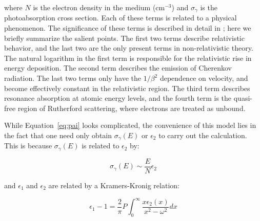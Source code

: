 where $N$ is the electron density in the medium (cm$^{-3}$) and $\sigma_{\gamma}$ is the photoabsorption cross section. Each of these terms is related to a physical phenomenon. The significance of these terms is described in detail in \cite{AllisonCobb:1980}; here we briefly summarize the salient points. The first two terms describe relativistic behavior, and the last two are the only present terms in non-relativistic theory. The natural logarithm in the first term is responsible for the relativistic rise in energy deposition. The second term describes the emission of Cherenkov radiation. The last two terms only have the $1/\beta^{2}$ dependence on velocity, and become effectively constant in the relativistic region. The third term describes resonance absorption at atomic energy levels, and the fourth term is the quasi-free region of Rutherford scattering, where electrons are treated as unbound.


While Equation~\ref{eq:pai} looks complicated, the convenience of this model lies in the fact that one need only obtain $\sigma_{\gamma}(E)$ or $\epsilon_{2}$ to carry out the calculation. This is because $\sigma_{\gamma}(E)$ is related to $\epsilon_{2}$ by:

\begin{equation}
\label{eq:sigma_gamma}
\sigma_{\gamma}(E) \sim \frac{E}{N} \epsilon_{2}
\end{equation}

and $\epsilon_{1}$ and $\epsilon_{2}$ are related by a Kramers-Kronig relation:

\begin{equation}
\epsilon_{1} - 1 = \frac{2}{\pi} P \int_{0}^{\infty} \frac{ x \epsilon_{2}(x)}{x^{2} - \omega^{2}} dx
\end{equation}

